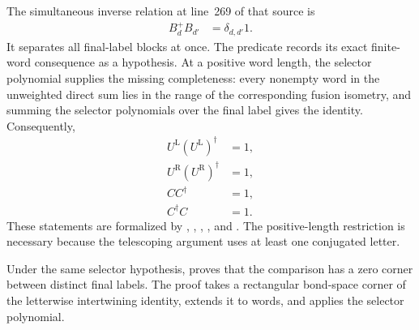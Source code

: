 \documentclass{article}
\begin{document}
The simultaneous inverse relation at line~269 of that source is
\begin{align}
    B_d^+B_{d'}
        &= \delta_{d,d'}1.
\label{eq:cpgsv17_blocked_chi_uniformity_simultaneous_inverse_relation}
\end{align}
It separates all final-label blocks at once. The predicate
records its exact finite-word consequence as a hypothesis. At a positive word
length, the selector polynomial supplies the missing completeness: every
nonempty word in the unweighted direct sum lies in the range of the
corresponding fusion isometry, and summing the selector polynomials over the
final label gives the identity. Consequently,
\begin{align}
    U^{\mathrm L}(U^{\mathrm L})^\dagger
        &= 1,
\label{eq:cpgsv17_blocked_chi_uniformity_left_coisometry}\\
    U^{\mathrm R}(U^{\mathrm R})^\dagger
        &= 1,
\label{eq:cpgsv17_blocked_chi_uniformity_right_coisometry}\\
    CC^\dagger
        &= 1,
\label{eq:cpgsv17_blocked_chi_uniformity_comparison_left_unitarity}\\
    C^\dagger C
        &= 1.
\label{eq:cpgsv17_blocked_chi_uniformity_comparison_right_unitarity}
\end{align}
These statements are formalized by
,
,
,
,
and
.
The positive-length restriction is necessary because the telescoping argument
uses at least one conjugated letter.

Under the same selector hypothesis,
proves that the comparison has a zero corner between distinct final labels.
The proof takes a rectangular bond-space corner of the letterwise
intertwining identity, extends it to words, and applies the selector
polynomial.
\end{document}

